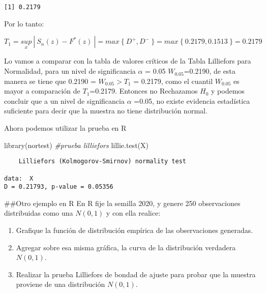 \documentclass[
  a4paper,
  oneside,
  openany]{book}
\newenvironment{Shaded}{\begin{snugshade}}{\end{snugshade}}
\newcommand{\CommentTok}[1]{\textcolor[rgb]{0.56,0.35,0.01}{\textit{#1}}}
\newcommand{\FunctionTok}[1]{\textcolor[rgb]{0.00,0.00,0.00}{#1}}
\newcommand{\NormalTok}[1]{#1}
\begin{document}
\begin{verbatim}
[1] 0.2179
\end{verbatim}

Por lo tanto:

\[T_{1}=\underset{x}{sup} \ | \ S_{n}(z)-F^*(z)\ |=max \ \{\ D^+,D^- \ \}=max \ \{ \  0.2179,0.1513 \ \}=0.2179 \]

Lo vamos a comparar con la tabla de valores críticos de la Tabla Lilliefors para Normalidad, para un nivel de significancia \(\alpha\) = 0.05 \(W_{0.05}\)=0.2190, de esta manera se tiene que 0.2190 = \(W_{0.05} > T_{1}\) = 0.2179, como el cuantil \(W_{0.05}\) es mayor a comparación de \(T_{1}\)=0.2179.
Entonces no Rechazamos \(H_0\) y podemos concluir que a un nivel de significancia \(\alpha\) =0.05, no existe evidencia estadística suficiente para decir que la muestra no tiene distribución normal.

Ahora podemos utilizar la prueba en R

\begin{Shaded}
\begin{Highlighting}[]
\FunctionTok{library}\NormalTok{(nortest) }\CommentTok{\#prueba lilliefors}
\FunctionTok{lillie.test}\NormalTok{(X)}
\end{Highlighting}
\end{Shaded}

\begin{verbatim}
    Lilliefors (Kolmogorov-Smirnov) normality test

data:  X
D = 0.21793, p-value = 0.05356
\end{verbatim}

\#\#Otro ejemplo en R
En R fije la semilla 2020, y genere 250 observaciones distribuidas como una \(N(0, 1)\) y con ella realice:

\begin{enumerate}
\item Grafique la función de distribución empírica de las observaciones generadas.
\item Agregar sobre esa misma gráfica, la curva de la distribución verdadera $N(0,1)$. 
\item Realizar la prueba Lilliefors de bondad de ajuste para probar que la muestra proviene de una distribución $N(0,1)$.
\end{enumerate}
\end{document}
